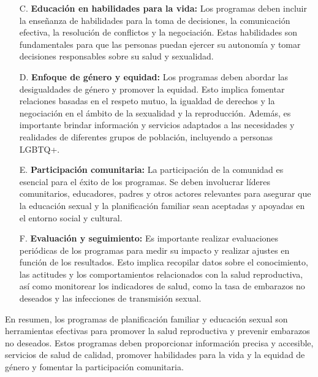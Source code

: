 \documentclass[8pt,a4paper]{beamer}
\begin{document}
{\begin{frame}{}
\begin{block}{}
\begin{enumerate}
\item[C.] \textbf{Educación en habilidades para la vida:} Los programas deben incluir la enseñanza de habilidades para la toma de decisiones, la comunicación efectiva, la resolución de conflictos y la negociación. Estas habilidades son fundamentales para que las personas puedan ejercer su autonomía y tomar decisiones responsables sobre su salud y sexualidad.

\item[D.] \textbf{Enfoque de género y equidad:} Los programas deben abordar las desigualdades de género y promover la equidad. Esto implica fomentar relaciones basadas en el respeto mutuo, la igualdad de derechos y la negociación en el ámbito de la sexualidad y la reproducción. Además, es importante brindar información y servicios adaptados a las necesidades y realidades de diferentes grupos de población, incluyendo a personas LGBTQ+.
\end{enumerate}
\end{block}
\end{frame}

\begin{frame}{}
\begin{block}{}
\setlength{\parskip}{3px}
\justifying
\begin{enumerate}
\setlength{\parskip}{3px}
\justifying
\item[E.] \textbf{Participación comunitaria:} La participación de la comunidad es esencial para el éxito de los programas. Se deben involucrar líderes comunitarios, educadores, padres y otros actores relevantes para asegurar que la educación sexual y la planificación familiar sean aceptadas y apoyadas en el entorno social y cultural.

\item[F.] \textbf{Evaluación y seguimiento:} Es importante realizar evaluaciones periódicas de los programas para medir su impacto y realizar ajustes en función de los resultados. Esto implica recopilar datos sobre el conocimiento, las actitudes y los comportamientos relacionados con la salud reproductiva, así como monitorear los indicadores de salud, como la tasa de embarazos no deseados y las infecciones de transmisión sexual.
\end{enumerate}
En resumen, los programas de planificación familiar y educación sexual son herramientas efectivas para promover la salud reproductiva y prevenir embarazos no deseados. Estos programas deben proporcionar información precisa y accesible, servicios de salud de calidad, promover habilidades para la vida y la equidad de género y fomentar la participación comunitaria. 
\end{block}
\end{frame}


}
\end{document}
